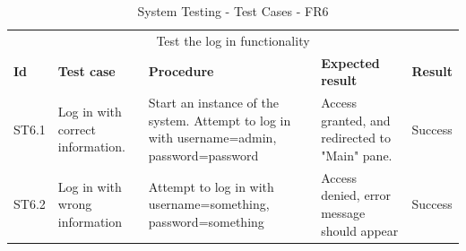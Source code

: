 \begin{table}[ht!]
\begin{tabular}{|m{1cm}|m{2cm}|m{4cm}|m{3cm}|m{1cm}|}
\hline
\rowcolor{lightgray}
\multicolumn{5}{|c|}{\textbf{FR6, Log in}} \\ \hline
\multicolumn{5}{|c|}{{Test the log in functionality}} \\ \hline
\textbf{Id} & \textbf{Test case} & \textbf{Procedure} & \textbf{Expected result} & \textbf{Result} \\ \hline
ST6.1 & Log in with correct information. & Start an instance of the system. Attempt to log in with username=admin, password=password & Access granted, and redirected to "Main" pane. & Success \\ \hline
ST6.2 & Log in with wrong information & Attempt to log in with username=something, password=something & Access denied, error message should appear & Success \\ \hline

\end{tabular}
\caption{System Testing - Test Cases - FR6}
\label{table:system-testing-cases-fr6}
\end{table}


